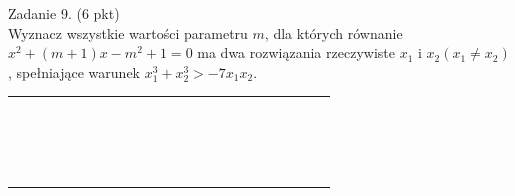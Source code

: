 \documentclass[10pt]{article}
\begin{document}
Zadanie 9. (6 pkt)\\
Wyznacz wszystkie wartości parametru \(m\), dla których równanie \(x^{2}+(m+1) x-m^{2}+1=0\) ma dwa rozwiązania rzeczywiste \(x_{1}\) i \(x_{2}\left(x_{1} \neq x_{2}\right)\), spełniające warunek \(x_{1}^{3}+x_{2}^{3}>-7 x_{1} x_{2}\).

\begin{center}
\begin{tabular}{|c|c|c|c|c|c|c|c|c|c|c|c|c|c|c|c|c|c|c|c|c|c|c|}
\hline
 &  &  &  &  &  &  &  &  &  &  &  &  &  &  &  &  &  &  &  &  &  &  \\
\hline
 &  &  &  &  &  &  &  &  &  &  &  &  &  &  &  &  &  &  &  &  &  &  \\
\hline
 &  &  &  &  &  &  &  &  &  &  &  &  &  &  &  &  &  &  &  &  &  &  \\
\hline
 &  &  &  &  &  &  &  &  &  &  &  &  &  &  &  &  &  &  &  &  &  &  \\
\hline
 &  &  &  &  &  &  &  &  &  &  &  &  &  &  &  &  &  &  &  &  &  &  \\
\hline
 &  &  &  &  &  &  &  &  &  &  &  &  &  &  &  &  &  &  &  &  &  &  \\
\hline
 &  &  &  &  &  &  &  &  &  &  &  &  &  &  &  &  &  &  &  &  &  &  \\
\hline
 &  &  &  &  &  &  &  &  &  &  &  &  &  &  &  &  &  &  &  &  &  &  \\
\hline
 &  &  &  &  &  &  &  &  &  &  &  &  &  &  &  &  &  &  &  &  &  &  \\
\hline
 &  &  &  &  &  &  &  &  &  &  &  &  &  &  &  &  &  &  &  &  &  &  \\
\hline
 &  &  &  &  &  &  &  &  &  &  &  &  &  &  &  &  &  &  &  &  &  &  \\
\hline
 &  &  &  &  &  &  &  &  &  &  &  &  &  &  &  &  &  &  &  &  &  &  \\
\hline
 &  &  &  &  &  &  &  &  &  &  &  &  &  &  &  &  &  &  &  &  &  &  \\
\hline
 &  &  &  &  &  &  &  &  &  &  &  &  &  &  &  &  &  &  &  &  &  &  \\
\hline
 &  &  &  &  &  &  &  &  &  &  &  &  &  &  &  &  &  &  &  &  &  &  \\
\hline
 &  &  &  &  &  &  &  &  &  &  &  &  &  &  &  &  &  &  &  &  &  &  \\
\hline
 &  &  &  &  &  &  &  &  &  &  &  &  &  &  &  &  &  &  &  &  &  &  \\
\hline
 &  &  &  &  &  &  &  &  &  &  &  &  &  &  &  &  &  &  &  &  &  &  \\

\end{tabular}
\end{center}
\end{document}
